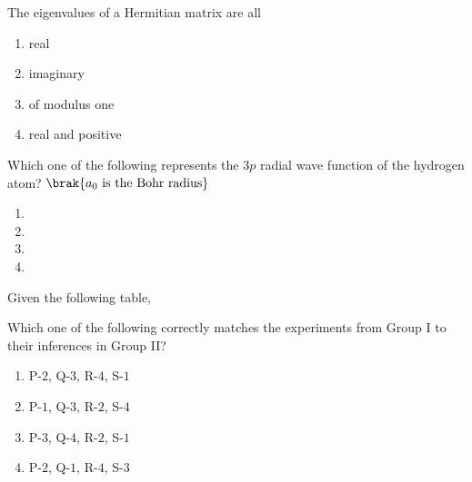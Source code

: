 \iffalse
                       
                        
                        
                        
                    
                        \author{AI24BTECH11006 - Bugada Roopansha}
                        \section{PH}
                        \chapter{2018}
                        \fi
 
   \item The eigenvalues of a Hermitian matrix are all
   \begin{enumerate}
       \item real
\item imaginary
\item of modulus one
\item  real and positive
   \end{enumerate}


\item Which one of the following represents the $3p$ radial wave function of the hydrogen atom? $\brak{a_0 \text{ is the Bohr radius}}$

\begin{enumerate}

\item

\item

\item

\item

\end{enumerate}



\item Given the following table,


Which one of the following correctly matches the experiments from Group I to their inferences in Group II?
\begin{enumerate}
    \item P-$2$, Q-$3$, R-$4$, S-$1$
    \item P-$1$, Q-$3$, R-$2$, S-$4$
    \item P-$3$, Q-$4$, R-$2$, S-$1$
    \item P-$2$, Q-$1$, R-$4$, S-$3$
\end{enumerate}

